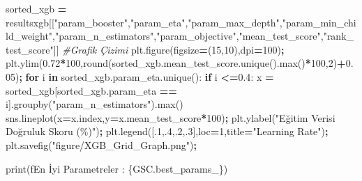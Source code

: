 \documentclass[12pt,twoside]{deuthesis}
\newenvironment{Shaded}{\begin{snugshade}}{\end{snugshade}}
\newcommand{\BuiltInTok}[1]{#1}
\newcommand{\CommentTok}[1]{\textcolor[rgb]{0.56,0.35,0.01}{\textit{#1}}}
\newcommand{\ControlFlowTok}[1]{\textcolor[rgb]{0.13,0.29,0.53}{\textbf{#1}}}
\newcommand{\DecValTok}[1]{\textcolor[rgb]{0.00,0.00,0.81}{#1}}
\newcommand{\FloatTok}[1]{\textcolor[rgb]{0.00,0.00,0.81}{#1}}
\newcommand{\KeywordTok}[1]{\textcolor[rgb]{0.13,0.29,0.53}{\textbf{#1}}}
\newcommand{\NormalTok}[1]{#1}
\newcommand{\OperatorTok}[1]{\textcolor[rgb]{0.81,0.36,0.00}{\textbf{#1}}}
\newcommand{\SpecialCharTok}[1]{\textcolor[rgb]{0.00,0.00,0.00}{#1}}
\newcommand{\SpecialStringTok}[1]{\textcolor[rgb]{0.31,0.60,0.02}{#1}}
\newcommand{\StringTok}[1]{\textcolor[rgb]{0.31,0.60,0.02}{#1}}
\begin{document}
\begin{Shaded}
\begin{Highlighting}[]
\NormalTok{sorted\_xgb }\OperatorTok{=}\NormalTok{ resultsxgb[[}\StringTok{"param\_booster"}\NormalTok{,}\StringTok{"param\_eta"}\NormalTok{,}\StringTok{"param\_max\_depth"}\NormalTok{,}\StringTok{"param\_min\_child\_weight"}\NormalTok{,}\StringTok{"param\_n\_estimators"}\NormalTok{,}\StringTok{"param\_objective"}\NormalTok{,}\StringTok{"mean\_test\_score"}\NormalTok{,}\StringTok{"rank\_test\_score"}\NormalTok{]]}
\CommentTok{\#Grafik Çizimi}
\NormalTok{plt.figure(figsize}\OperatorTok{=}\NormalTok{(}\DecValTok{15}\NormalTok{,}\DecValTok{10}\NormalTok{),dpi}\OperatorTok{=}\DecValTok{100}\NormalTok{)}\OperatorTok{;}
\NormalTok{plt.ylim(}\FloatTok{0.72}\OperatorTok{*}\DecValTok{100}\NormalTok{,}\BuiltInTok{round}\NormalTok{(sorted\_xgb.mean\_test\_score.unique().}\BuiltInTok{max}\NormalTok{()}\OperatorTok{*}\DecValTok{100}\NormalTok{,}\DecValTok{2}\NormalTok{)}\OperatorTok{+}\FloatTok{0.05}\NormalTok{)}\OperatorTok{;}
\ControlFlowTok{for}\NormalTok{ i }\KeywordTok{in}\NormalTok{ sorted\_xgb.param\_eta.unique():}
    \ControlFlowTok{if}\NormalTok{ i }\OperatorTok{\textless{}=}\FloatTok{0.4}\NormalTok{:}
\NormalTok{        x }\OperatorTok{=}\NormalTok{ sorted\_xgb[sorted\_xgb.param\_eta }\OperatorTok{==}\NormalTok{ i].groupby(}\StringTok{"param\_n\_estimators"}\NormalTok{).}\BuiltInTok{max}\NormalTok{()}
\NormalTok{        sns.lineplot(x}\OperatorTok{=}\NormalTok{x.index,y}\OperatorTok{=}\NormalTok{x.mean\_test\_score}\OperatorTok{*}\DecValTok{100}\NormalTok{)}\OperatorTok{;}
\NormalTok{plt.ylabel(}\StringTok{"Eğitim Verisi Doğruluk Skoru (\%)"}\NormalTok{)}\OperatorTok{;}
\NormalTok{plt.legend([}\FloatTok{.1}\NormalTok{,}\FloatTok{.4}\NormalTok{,}\FloatTok{.2}\NormalTok{,}\FloatTok{.3}\NormalTok{],loc}\OperatorTok{=}\DecValTok{1}\NormalTok{,title}\OperatorTok{=}\StringTok{"Learning Rate"}\NormalTok{)}\OperatorTok{;}
\NormalTok{plt.savefig(}\StringTok{"figure/XGB\_Grid\_Graph.png"}\NormalTok{)}\OperatorTok{;}
\end{Highlighting}
\end{Shaded}
\begin{Shaded}
\begin{Highlighting}[]
\BuiltInTok{print}\NormalTok{(}\SpecialStringTok{f\textquotesingle{}En İyi Parametreler : }\SpecialCharTok{\{}\NormalTok{GSC}\SpecialCharTok{.}\NormalTok{best\_params\_}\SpecialCharTok{\}}\SpecialStringTok{\textquotesingle{}}\NormalTok{)}
\end{Highlighting}
\end{Shaded}
\end{document}
